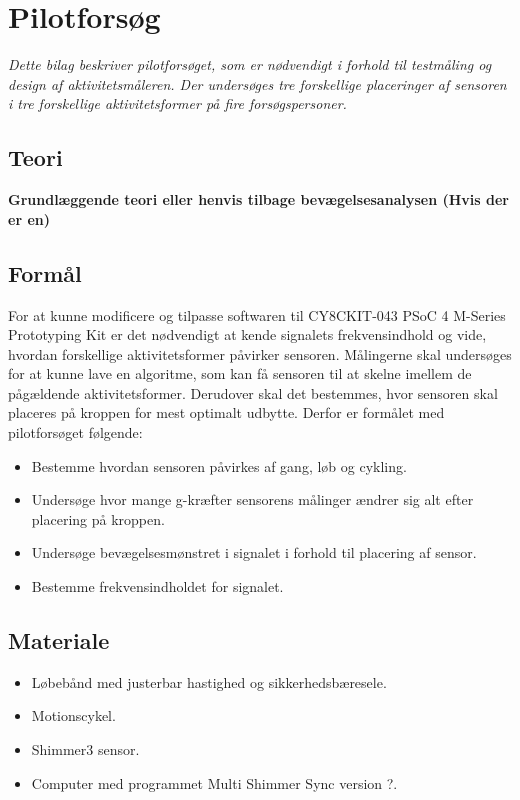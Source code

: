 \chapter{Pilotforsøg}\vspace{-.75cm}
\textit{Dette bilag beskriver pilotforsøget, som er nødvendigt i forhold til testmåling og design af aktivitetsmåleren. Der undersøges tre forskellige placeringer af sensoren i tre forskellige aktivitetsformer på fire forsøgspersoner.}

\section{Teori}
\textbf{Grundlæggende teori eller henvis tilbage bevægelsesanalysen (Hvis der er en)}

\section{Formål}
For at kunne modificere og tilpasse softwaren til CY8CKIT-043 PSoC 4 M-Series Prototyping Kit er det nødvendigt at kende signalets frekvensindhold og vide, hvordan forskellige aktivitetsformer påvirker sensoren. Målingerne skal undersøges for at kunne lave en algoritme, som kan få sensoren til at skelne imellem de pågældende aktivitetsformer. Derudover skal det bestemmes, hvor sensoren skal placeres på kroppen for mest optimalt udbytte. Derfor er formålet med pilotforsøget følgende:
\begin{itemize}
	\item Bestemme hvordan sensoren påvirkes af gang, løb og cykling.
	\item Undersøge hvor mange g-kræfter sensorens målinger ændrer sig alt efter placering på kroppen.
	\item Undersøge bevægelsesmønstret i signalet i forhold til placering af sensor.
	\item Bestemme frekvensindholdet for signalet.
\end{itemize}

\section{Materiale}
\begin{itemize}
	\item Løbebånd med justerbar hastighed og sikkerhedsbæresele.
	\item Motionscykel.
	\item Shimmer3 sensor.
	\item Computer med programmet Multi Shimmer Sync version ?.
\end{itemize}

